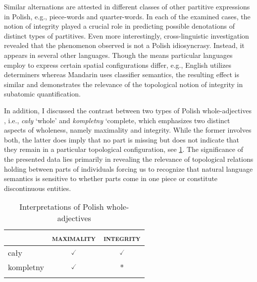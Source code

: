 Similar alternations are attested in different classes of other partitive expressions in Polish, e.g., piece-words and quarter-words. In each of the examined cases, the notion of integrity played a crucial role in predicting possible denotations of distinct types of partitives. Even more interestingly, cross-linguistic investigation revealed that the phenomenon observed is not a Polish idiosyncrasy. Instead, it appears in several other languages. Though the means particular languages employ to express certain spatial configurations differ, e.g., English utilizes determiners whereas Mandarin uses classifier semantics, the resulting effect is similar and demonstrates the relevance of the topological notion of integrity in subatomic quantification.    

In addition, I discussed the contrast between two types of Polish whole-adjec\-tives \citep[see][]{moltmann1997parts,morzycki2002wholes}, i.e., \textit{cały} `whole' and \textit{kompletny} `complete, which emphasizes two distinct aspects of wholeness, namely maximality and integrity. While the former involves both, the latter does imply that no part is missing but does not indicate that they remain in a particular topological configuration, see \ref{tab:interpretations-of-polish-whole-adjectives2}. The significance of the presented data lies primarily in revealing the relevance of topological relations holding between parts of individuals forcing us to recognize that natural language semantics is sensitive to whether parts come in one piece or constitute discontinuous entities. 

		\begin{table}[h!]
			\centering
			\begin{tabular}{lcc}
				\lsptoprule
				      & \textsc{maximality} & \textsc{integrity} \\ \midrule
				cały  & $\checked$    & $\checked$  \\
				kompletny & $\checked$   & * \\ \lspbottomrule
			\end{tabular}
			\caption{Interpretations of Polish whole-adjectives}
            \label{tab:interpretations-of-polish-whole-adjectives2}
		\end{table}

